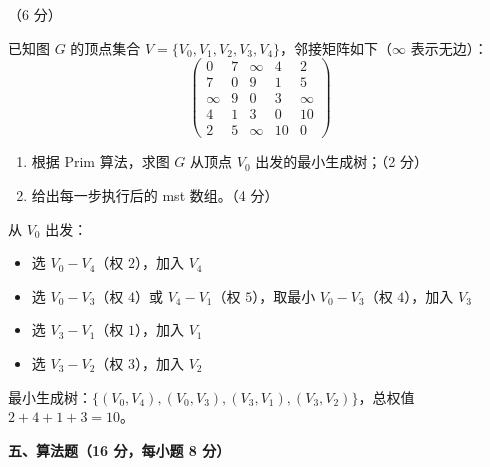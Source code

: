 \begin{question}[Prim算法求最小生成树]（6 分）

已知图 $G$ 的顶点集合 $V=\{V_0,V_1,V_2,V_3,V_4\}$，邻接矩阵如下（$\infty$ 表示无边）：
\[
\begin{pmatrix}
0 & 7 & \infty & 4 & 2\\
7 & 0 & 9 & 1 & 5\\
\infty & 9 & 0 & 3 & \infty\\
4 & 1 & 3 & 0 & 10\\
2 & 5 & \infty & 10 & 0
\end{pmatrix}
\]

\begin{enumerate}[label=\arabic*)]
  \item 根据 Prim 算法，求图 $G$ 从顶点 $V_0$ 出发的最小生成树；（2 分）
  \item 给出每一步执行后的 mst 数组。（4 分）
\end{enumerate}

\begin{solution}
从 $V_0$ 出发：
\begin{itemize}
  \item 选 $V_0-V_4$（权 $2$），加入 $V_4$
  \item 选 $V_0-V_3$（权 $4$）或 $V_4-V_1$（权 $5$），取最小 $V_0-V_3$（权 $4$），加入 $V_3$
  \item 选 $V_3-V_1$（权 $1$），加入 $V_1$
  \item 选 $V_3-V_2$（权 $3$），加入 $V_2$
\end{itemize}
最小生成树：$\{(V_0,V_4),(V_0,V_3),(V_3,V_1),(V_3,V_2)\}$，总权值 $2+4+1+3=10$。
\end{solution}
\end{question}

\clearpage

\textbf{五、算法题（16 分，每小题 8 分）}

